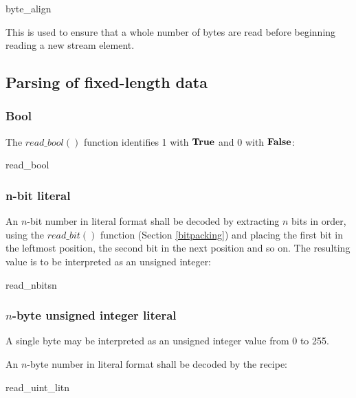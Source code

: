 \begin{pseudo}{byte\_align}{}
\bsEND
\end{pseudo}

This is used to ensure that a whole number of bytes are read before
beginning reading a new stream element.

\subsection{Parsing of fixed-length data}
\subsubsection{Bool}

The $read\_bool()$ function identifies 1 with $\text{\bf{True}}$ and 0 with $\text{\bf{False}}$:

\begin{pseudo}{read\_bool}{}
    \bsRET{\true}
\bsELSE
    \bsRET{\false}
\bsEND
\end{pseudo}

\subsubsection{n-bit literal}
An $n$-bit number in literal format shall be decoded by extracting $n$ bits
in order, using the $read\_bit()$ function (Section \ref{bitpacking})
 and placing the first bit in the leftmost position, the second
bit in the next position and so on. The resulting value is to be
interpreted as an unsigned integer:

\begin{pseudo}{read\_nbits}{n}
\bsEND
{}
\end{pseudo}

\subsubsection{$n$-byte unsigned integer literal}
A single byte may be interpreted as an unsigned integer value from 0 to 255.

An $n$-byte number in literal format shall be decoded by the recipe:

\begin{pseudo}{read\_uint\_lit}{n}
\bsEND
{}
\end{pseudo}

